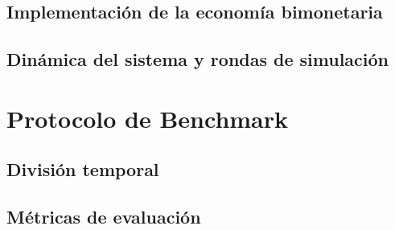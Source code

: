 \subsection{Implementación de la economía bimonetaria}
\label{subsec:bimonetaria-impl}

\subsection{Dinámica del sistema y rondas de simulación}
\label{subsec:dinamica}

\section{Protocolo de Benchmark}
\label{sec:protocolo-comparacion}

\subsection{División temporal}
\label{subsec:division-temporal}

\subsection{Métricas de evaluación}
\label{subsec:metricas}
